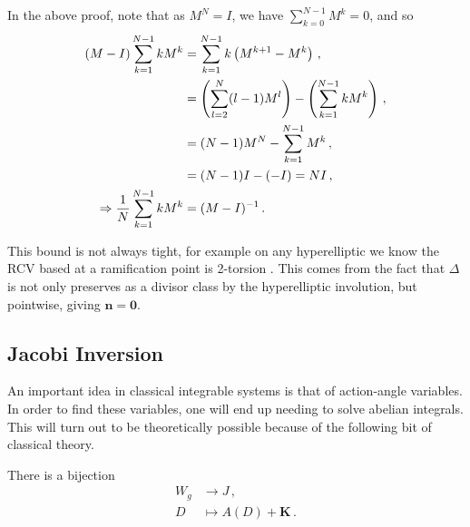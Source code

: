 \documentclass{article}
\begin{document}
\begin{remark}
	In the above proof, note that as $M^N=I$, we have $\sum_{k=0}^{N-1} M^k = 0$, and so 
	\begin{align*}
		(M-I) \sum_{k=1}^{N-1} k M^k &= \sum_{k=1}^{N-1} k \left( M^{k+1}-M^k \right) \, , \\
		&= \left( \sum_{l=2}^{N} (l-1) M^l \right) - \left( \sum_{k=1}^{N-1} k M^k  \right) \, , \\
		&= (N-1)M^N - \sum_{k=1}^{N-1} M^k \, , \\
		&= (N-1)I - (-I) = NI\, , \\
		\Rightarrow \frac{1}{N}\sum_{k=1}^{N-1} k M^k &= (M-I)^{-1} \, . 
	\end{align*} 
\end{remark}

\begin{remark}
	This bound is not always tight, for example on any hyperelliptic we know the RCV based at a ramification point is 2-torsion \cite{Farkas1992}. This comes from the fact that $\Delta$ is not only preserves as a divisor class by the hyperelliptic involution, but pointwise, giving $\bm{n} = \bm{0}$. 
\end{remark}

\subsection{Jacobi Inversion}
An important idea in classical integrable systems is that of action-angle variables. In order to find these variables, one will end up needing to solve abelian integrals. This will turn out to be theoretically possible because of the following bit of classical theory. 

\begin{theorem}
	There is a bijection
	\begin{align*}
		W_g &\to J \, , \\
		D &\mapsto A(D)+\bm{K} \, . 
	\end{align*}
\end{theorem}


\end{document}
